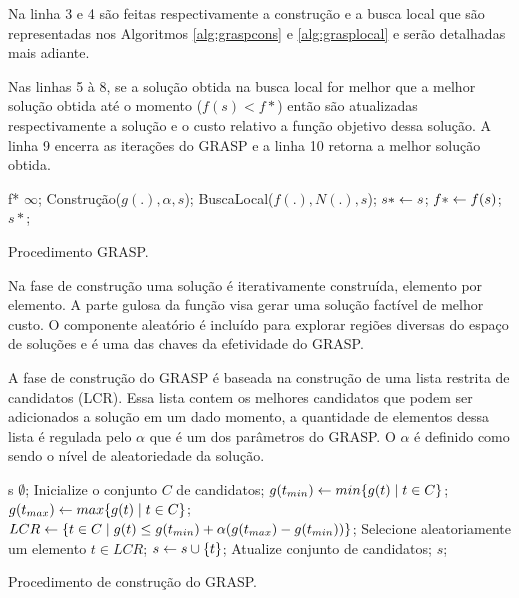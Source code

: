 Na linha 3 e 4 são feitas respectivamente a construção e a busca local que são representadas nos Algoritmos \ref{alg:graspcons} e \ref{alg:grasplocal} e serão detalhadas mais adiante.

Nas linhas 5 à 8, se a solução obtida na busca local for melhor que a melhor solução obtida até o momento ($f(s) < f{*}$) então são atualizadas respectivamente a solução e o custo relativo a função objetivo dessa solução. 
A linha 9 encerra as iterações do GRASP e a linha 10 retorna a melhor solução obtida.

\begin{pgrm}[h]
\begin{programma}
\STATE f{*} \GETS $\infty$;
\STATE Construção($g(.), \alpha, s$);
\STATE BuscaLocal($f(.),N(.),s$);
\STATE $s{*} \leftarrow s$;
\STATE $f{*} \leftarrow f(s)$;
\ENDIF
\ENDFOR
\STATE\RETURN $s{*}$;
\ENDALGORITHM
\end{programma}
\caption{Procedimento GRASP.}\label{alg:grasp}
\end{pgrm}

Na fase de construção uma solução é iterativamente construída, elemento por elemento. A parte gulosa da função visa gerar uma solução factível de melhor custo. O componente aleatório é incluído para explorar
regiões diversas do espaço de soluções e é uma das chaves da efetividade do GRASP.

A fase de construção do GRASP é baseada na construção de uma lista restrita de candidatos (LCR). Essa lista contem os melhores candidatos que podem ser adicionados a solução em um dado momento, a quantidade de elementos dessa lista é regulada pelo $\alpha$ que é um dos parâmetros do GRASP. O $\alpha$ é definido como sendo o nível de aleatoriedade da solução.

\begin{pgrm}[h]
\begin{programma}
\STATE s \GETS $\emptyset$;
\STATE Inicialize o conjunto $C$ de candidatos;
\STATE $g(t_{min}) \leftarrow min\{g(t) \mid t \in C\}$;
\STATE $g(t_{max}) \leftarrow max\{g(t) \mid t \in C\}$;
\STATE $LCR \leftarrow \{t \in C \mid g(t) \leq g(t_{min}) + \alpha(g(t_{max}) - g(t_{min}))\}$;
\STATE Selecione aleatoriamente um elemento $t \in LCR$;
\STATE $s \leftarrow s \cup \{t\}$;
\STATE Atualize conjunto de candidatos;
\ENDWHILE
\STATE\RETURN $s$;
\ENDALGORITHM
\end{programma}
\caption{Procedimento de construção do GRASP.}\label{alg:graspcons}
\end{pgrm}

